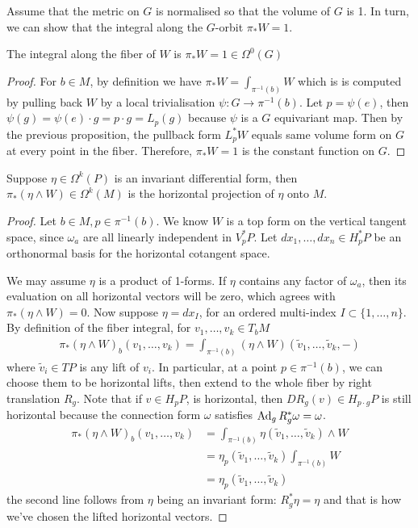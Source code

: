 Assume that the metric on $G$ is normalised so that the volume of $G$ is 1.
In turn, we can show that the integral along the $G$-orbit $\pi_*W = 1$. 
\begin{cor}
	The integral along the fiber of $W$ is  $\pi_*W = 1 \in \Omega^0(G)$
\end{cor}
\begin{proof}
	For $b\in M$, by definition we have $\pi_*W = \int_{\pi^{-1}(b)} W$ which is
	is computed by pulling back $W$ by a 
	local trivialisation $\psi : G \to \pi^{-1}(b)$. 
	Let $p=\psi(e)$, then $\psi(g) = \psi(e)\cdot g = p\cdot g = L_p(g)$ because
	$\psi$ is a  $G$ equivariant map. Then by the previous proposition, the
	pullback form $L_p^*W$ equals same volume form on $G$ at every point in the 
	fiber. Therefore, $\pi_*W = 1$ is the constant function on  $G$.
\end{proof}

\begin{prop} \label{prop:integral_horizontal_proj}
	Suppose $\eta \in \Omega^k(P)$ is an invariant differential form, then
	 $\pi_*(\eta \wedge W) \in \Omega^k(M)$ is the horizontal projection of 
	 $\eta$ onto $M$.
\end{prop}
\begin{proof}
	Let $b\in M, p\in \pi^{-1}(b)$. 
	We know  $W$ is a top form on the vertical tangent space, 
	since  $\omega_a$ are all linearly independent in $V_p^*P$. Let
	$dx_1,\ldots,dx_n \in H_p^*P$ be an orthonormal basis for the horizontal
	cotangent space. 

	We may assume $\eta$ is a product of 1-forms. If $\eta$ contains any factor of
	$\omega_a$, then its evaluation on all horizontal vectors will be zero, which
	agrees with $\pi_*(\eta\wedge W) = 0$. Now suppose $\eta = dx_I$, for 
	an ordered multi-index $I\subset\{1,\ldots,n\}$.
	By definition of the fiber integral, for $v_1,\ldots,v_k \in T_bM$
	\begin{align*}
		\pi_*(\eta\wedge W)_b(v_1,\ldots,v_k) 
		= \int_{\pi^{-1}(b)} (\eta\wedge W)(\widetilde{v}_1,\ldots,\widetilde{v}_k,-)
	\end{align*}
	where $\widetilde{v}_i \in TP$ is any lift of $v_i$. In particular, at a
	point $p\in \pi^{-1}(b)$, we can choose them to be horizontal lifts, then
	extend to the whole fiber by right translation $R_g$. Note that if  $v\in H_pP$, is
	horizontal, then  $DR_g(v) \in H_{p\cdot g}P$ is still horizontal because 
	the connection form $\omega$ satisfies  $\operatorname{Ad}_g R_g^* \omega = \omega$. 
	\begin{align*}
		\pi_*(\eta\wedge W)_b(v_1,\ldots,v_k) 
		&= \int_{\pi^{-1}(b)} \eta(\widetilde{v}_1,\ldots,\widetilde{v}_k)\wedge W \\
		&= \eta_p(\widetilde{v}_1,\ldots,\widetilde{v}_k)\int_{\pi^{-1}(b)} W \\
		&= \eta_p(\widetilde{v}_1,\ldots,\widetilde{v}_k) 
	\end{align*}
	the second line follows from $\eta$ being an invariant form: 
	$R_g^*\eta = \eta$ and that is how we've chosen the lifted horizontal
	vectors. 
\end{proof}



